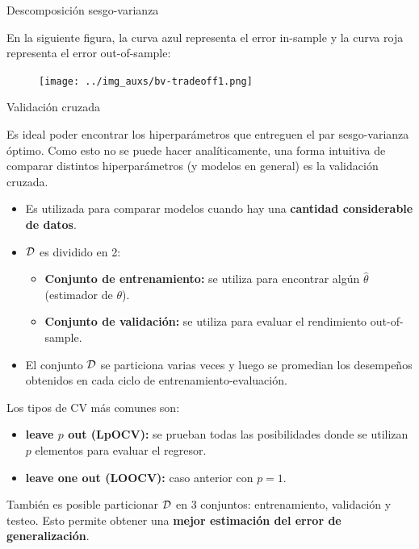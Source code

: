 \documentclass[handout, 9pt]{beamer}
\begin{document}
\begin{frame}{Descomposición sesgo-varianza}

En la siguiente figura, la curva azul representa el error in-sample y la curva roja representa el error out-of-sample:

\begin{figure}[h!]
\centering
	\texttt{[image: ../img\_auxs/bv-tradeoff1.png]}
\end{figure}

\end{frame}


\begin{frame}{Validación cruzada}

Es ideal poder encontrar los hiperparámetros que entreguen el par sesgo-varianza óptimo. Como esto no se puede hacer analíticamente, una forma intuitiva de comparar distintos hiperparámetros (y modelos en general) es la validación cruzada.

\begin{itemize}
	\item Es utilizada para comparar modelos cuando hay una \textbf{cantidad considerable de datos}.
	\item ${\mathcal D}$ es dividido en 2:
	\begin{itemize}
		\item \textbf{Conjunto de entrenamiento:} se utiliza para encontrar algún $\hat{\theta}$ (estimador de $\theta$).
		\item \textbf{Conjunto de validación:} se utiliza para evaluar el rendimiento out-of-sample.
	\end{itemize}
	\item El conjunto ${\mathcal D}$ se particiona varias veces y luego se promedian los desempeños obtenidos en cada ciclo de entrenamiento-evaluación.
	
\end{itemize}

Los tipos de CV más comunes son:

\begin{itemize}
	\item \textbf{leave $p$ out (LpOCV):} se prueban todas las posibilidades donde se utilizan $p$ elementos para evaluar el regresor.
	\item \textbf{leave one out (LOOCV):} caso anterior con $p=1$.
\end{itemize}

También es posible particionar ${\mathcal D}$ en 3 conjuntos: entrenamiento, validación y testeo. Esto permite obtener una \textbf{mejor estimación del error de generalización}.
	
\end{frame}
\end{document}
